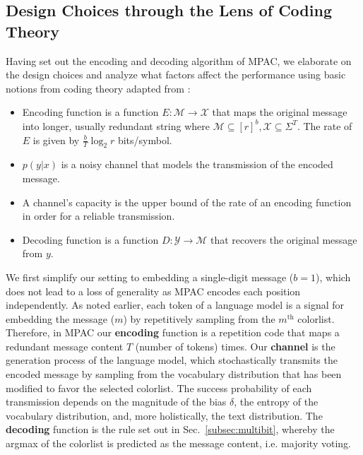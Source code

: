 \subsection{Design Choices through the Lens of Coding Theory}
Having set out the encoding and decoding algorithm of MPAC, we elaborate on the design choices and analyze what factors affect the performance using basic notions from coding theory adapted from \citet{cover1999elements}:  
\begin{itemize}
    \item Encoding function is a function $E: \mathcal{M} \rightarrow \mathcal{X}$  that maps the original message into longer, usually redundant string where $\mathcal{M} \subseteq [r]^b, \mathcal{X} \subseteq \Sigma^T$. The rate of $E$ is given by $\frac{b}{T} \log_2 r$ bits/symbol.
    \item  $p(y|x)$ is a noisy channel that models the transmission of the encoded message. 
    \item A channel's capacity is the upper bound of the rate of an encoding function in order for a reliable transmission.
   \item Decoding function is a function $D: \mathcal{Y} \rightarrow \mathcal{M}$ that recovers the original message from $y$.
\end{itemize}
We first simplify our setting to embedding a single-digit message ($b=1$), which does not lead to a loss of generality as MPAC encodes each position independently.  As noted earlier, each token of a language model is a signal for embedding the message ($m$) by repetitively sampling from the $m^{\text{th}}$ colorlist. Therefore, in MPAC our \textbf{encoding} function is a repetition code that maps a redundant message content $T$ (number of tokens) times. Our \textbf{channel} is the generation process of the language model, which stochastically transmits the encoded message by sampling from the vocabulary distribution that has been modified to favor the selected colorlist. The success probability of each transmission depends on the magnitude of the bias $\delta$, the entropy of the vocabulary distribution, and, more holistically, the text distribution. The \textbf{decoding} function is the rule set out in Sec.~\cref{subsec:multibit}, whereby the argmax of the colorlist is predicted as the message content, i.e. majority voting.  



